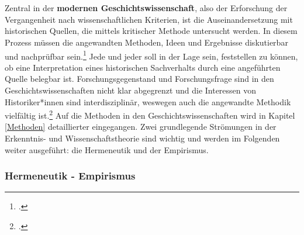 \documentclass[12pt,a4paper]{article}
\begin{document}
\\
\\
Zentral in der \textbf{modernen Geschichtswissenschaft}, also der Erforschung der Vergangenheit nach wissenschaftlichen Kriterien, ist die Auseinandersetzung mit historischen Quellen, die mittels kritischer Methode untersucht werden. In diesem Prozess müssen die angewandten Methoden, Ideen und Ergebnisse diskutierbar und nachprüfbar sein.\footcite[][S.13-32]{demand2011philosophie} Jede und jeder soll in der Lage sein, feststellen zu können, ob eine Interpretation eines historischen Sachverhalts durch eine angeführten Quelle belegbar ist. Forschungsgegenstand und Forschungsfrage sind in den Geschichtswissenschaften nicht klar abgegrenzt und die Interessen von Historiker*innen sind interdisziplinär, weswegen auch die angewandte Methodik vielfältig ist.\footcite[][S.13]{reiche2014verfahren} Auf die Methoden in den Geschichtswissenschaften wird in Kapitel \ref{Methoden} detaillierter eingegangen.
Zwei grundlegende Strömungen in der Erkenntnis- und Wissenschaftstheorie sind wichtig und werden im Folgenden weiter ausgeführt: die Hermeneutik und der Empirismus.


\subsubsection{Hermeneutik - Empirismus}
\end{document}
